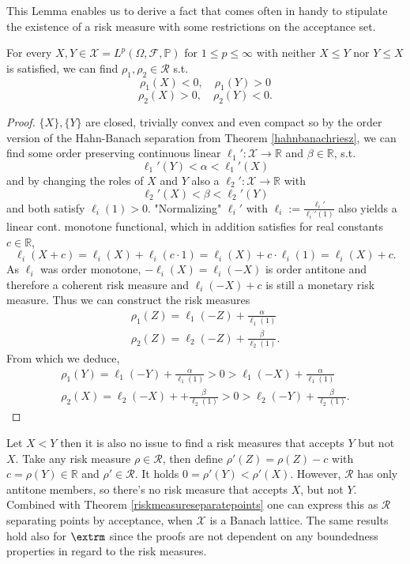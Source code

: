 This Lemma enables us to derive a fact that comes often in handy to stipulate the existence of a risk measure with some restrictions on the acceptance set.
\begin{theorem} \label{riskmeasureseparatepoints}
    For every \( X, Y \in \mathcal{X} = L^p(\Omega, \mathcal{F}, \mathbb{P}) \) for \( 1 \leq p \leq \infty \) with 
    neither \( X \leq Y \) nor \( Y \leq X \) is satisfied, we can 
    find \( \rho_1, \rho_2 \in \mathcal{R} \) s.t. 
    \[ \rho_1(X) < 0, \quad \rho_1(Y) > 0 \]
    \[ \rho_2(X) > 0, \quad \rho_2(Y) < 0. \]
\end{theorem}
\begin{proof}
    \( \{X\}, \{Y\} \) are closed, trivially convex and even compact
    so by the order version of the Hahn-Banach separation from Theorem \ref{hahnbanachriesz},
    we can find some order preserving continuous linear \( \ell_1' : \mathcal{X} \to \mathbb{R} \) and \( \beta \in \mathbb{R} \), 
    s.t. 
    \[ \ell_1'(Y) < \alpha < \ell_1'(X) \]
    and by changing the roles of \( X \) and \( Y \) also a 
    \( \ell_2' : \mathcal{X} \to \mathbb{R} \) with
    \[ \ell_2'(X) < \beta < \ell_2'(Y) \]
    and both satisfy \( \ell_i(1) > 0 \).
    "Normalizing" \( \ell_i' \) with \( \ell_i := \frac{\ell_i'}{\ell_i'(1)} \) also yields a linear cont. monotone functional,
    which in addition satisfies for real constants \( c \in \mathbb{R} \), 
    \[ \ell_i(X + c) =  \ell_i(X) + \ell_i(c\cdot 1) = \ell_i(X) + c \cdot\ell_i(1) = \ell_i(X) + c. \]
    As \( \ell_i \) was order monotone, \( -\ell_i(X) = \ell_i(-X) \) is order antitone
    and therefore a coherent risk measure and \( \ell_i(-X) + c \) is still a monetary risk measure.
    Thus we can construct the risk measures 
    \begin{align*}
        \rho_1(Z) = \ell_1(-Z) + \frac{\alpha}{\ell_1(1)} \\
        \rho_2(Z) = \ell_2(-Z) + \frac{\beta}{\ell_2(1)}.
    \end{align*}
    From which we deduce,
    \begin{align*}
        \rho_1(Y) = \ell_1(- Y) + \frac{\alpha}{\ell_1(1)} > 0 > \ell_1(- X) + \frac{\alpha}{\ell_1(1)} \\
        \rho_2(X) = \ell_2(- X) + + \frac{\beta}{\ell_2(1)} > 0 > \ell_2(-Y) + \frac{\beta}{\ell_2(1)}.
    \end{align*}
\end{proof}
\begin{remark} \label{separationremark}
    Let \( X < Y \) then it is also no issue to find a risk measures that accepts \( Y \) but not \( X \).
    Take any risk measure \( \rho \in \mathcal{R} \), then define \( \rho'(Z) = \rho(Z) - c \) with \( c = \rho(Y) \in \mathbb{R} \)
    and \( \rho' \in \mathcal{R} \). It holds \( 0 = \rho'(Y) < \rho'(X) \). 
    However, \( \mathcal{R} \) has only antitone members, so there's no risk measure that accepts
    \( X \), but not \( Y \).
    Combined with Theorem \ref{riskmeasureseparatepoints} one can express this as \( \mathcal{R} \) separating points by acceptance,
    when \( \mathcal{X} \) is a Banach lattice. 
    The same results hold also for \( \extrm \) since the proofs are not dependent on any boundedness properties in regard to the risk measures.
\end{remark}
